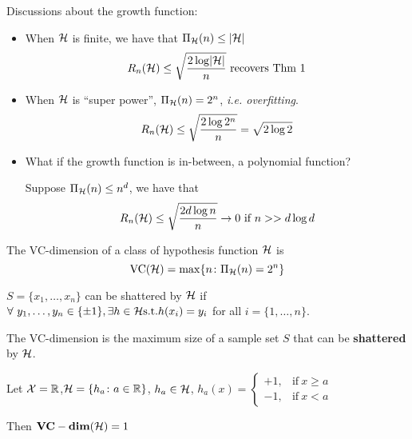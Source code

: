 \begin{remark}
    Discussions about the growth function: 
    \begin{itemize}
        \item When \(\mathcal{H}\) is finite, we have that \(\Pi_{\mathcal{H}} (n) \leq \lvert \mathcal{H} \rvert\) 
        \[
            R_n (\mathcal{H}) \leq \sqrt{ \frac{2\log \lvert \mathcal{H} \rvert}{n} } \text{ recovers Thm 1}  
        \]
        \item When \(\mathcal{H}\) is ``super power'', \(\Pi_{\mathcal{H}} (n) = 2^n\), \emph{i.e. overfitting}. 
        \[
            R_n (\mathcal{H}) \leq \sqrt{ \frac{2 \log 2^n}{n}} = \sqrt{2 \log 2}  
        \]
        \item What if the growth function is in-between, a polynomial function? 
        
        Suppose \(\Pi_{\mathcal{H}} (n) \leq n^d\), we have that 
        \[
            R_n(\mathcal{H}) \leq \sqrt{ \frac{2 d \log n}{n}} \to 0 \text{ if } n >> d \log d 
        \]
    \end{itemize}
\end{remark}




\begin{definition}[VC-dimension]\label{def:VC_dimension}
    The VC-dimension of a class of hypothesis function \(\mathcal{H}\) is 
    \[
        \text{VC}(\mathcal{H}) = \max \{ n \colon \Pi_{\mathcal{H}} (n) = 2^n \}  
    \]
\end{definition}

\begin{definition}[Shatter]\label{def:shatter}
    \(S = \{x_1, \ldots, x_n\}\) can be shattered by \(\mathcal{H}\) if 
    \(\forall \ y_1, \ldots, y_n \in \{\pm 1\}, \exists h \in \mathcal{H} \text{s.t.} h(x_i)=y_i\)
    for all \(i = \{1, \ldots, n\}\). 
\end{definition}

\begin{remark}
    The VC-dimension is the maximum size of a sample set \(S\) that can be \textbf{shattered}
    by \(\mathcal{H}\). 
\end{remark}

\begin{eg}
    Let \(\mathcal{X} = \mathbb{R}\),\(\mathcal{H} = \{h_a \colon a\in \mathbb{R}\}\),
     \(h_a \in \mathcal{H}\), \(h_a (x) = \begin{cases}
        +1, &\text{if} \ x \geq a \\ 
        -1, &\text{if} \ x < a 
    \end{cases}\)

     \begin{center}
        Then \(\mathbf{VC-dim}(\mathcal{H}) = 1\)
     \end{center} 
\end{eg}

